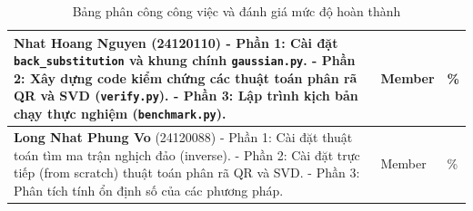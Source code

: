 \begin{table}[H]
\begin{tabular}{|p{}|>{\centering\arraybackslash}p{}|>{\centering\arraybackslash}p{}|}
        \textbf{Nhat Hoang Nguyen} (24120110) \newline 
        - Phần 1: Cài đặt \texttt{back\_substitution} và khung chính \texttt{gaussian.py}. \newline
        - Phần 2: Xây dựng code kiểm chứng các thuật toán phân rã QR và SVD (\texttt{verify.py}). \newline
        - Phần 3: Lập trình kịch bản chạy thực nghiệm (\texttt{benchmark.py}).
        & Member & 100\% \\ \hline
        
        \textbf{Long Nhat Phung Vo} (24120088) \newline 
        - Phần 1: Cài đặt thuật toán tìm ma trận nghịch đảo (inverse). \newline
        - Phần 2: Cài đặt trực tiếp (from scratch) thuật toán phân rã QR và SVD. \newline
        - Phần 3: Phân tích tính ổn định số của các phương pháp.
        & Member & 100\% \\ \hline
    \end{tabular}
    \caption{Bảng phân công công việc và đánh giá mức độ hoàn thành}
    \label{tab:task_assignment}
\end{table}